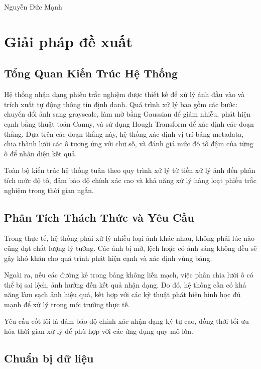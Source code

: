 \begin{savequote}[75mm] 
Nguyễn Đức Mạnh
\end{savequote}

\chapter{Giải pháp đề xuất}

\section{Tổng Quan Kiến Trúc Hệ Thống}

Hệ thống nhận dạng phiếu trắc nghiệm được thiết kế để xử lý ảnh đầu vào và trích xuất tự động thông tin định danh. Quá trình xử lý bao gồm các bước: chuyển đổi ảnh sang grayscale, làm mờ bằng Gaussian để giảm nhiễu, phát hiện cạnh bằng thuật toán Canny, và sử dụng Hough Transform để xác định các đoạn thẳng. Dựa trên các đoạn thẳng này, hệ thống xác định vị trí bảng metadata, chia thành lưới các ô tương ứng với chữ số, và đánh giá mức độ tô đậm của từng ô để nhận diện kết quả.

Toàn bộ kiến trúc hệ thống tuân theo quy trình xử lý từ tiền xử lý ảnh đến phân tích mức độ tô, đảm bảo độ chính xác cao và khả năng xử lý hàng loạt phiếu trắc nghiệm trong thời gian ngắn.

\section{Phân Tích Thách Thức và Yêu Cầu}

Trong thực tế, hệ thống phải xử lý nhiều loại ảnh khác nhau, không phải lúc nào cũng đạt chất lượng lý tưởng. Các ảnh bị mờ, lệch hoặc có ánh sáng không đều sẽ gây khó khăn cho quá trình phát hiện cạnh và xác định vùng bảng.

Ngoài ra, nếu các đường kẻ trong bảng không liền mạch, việc phân chia lưới ô có thể bị sai lệch, ảnh hưởng đến kết quả nhận dạng. Do đó, hệ thống cần có khả năng làm sạch ảnh hiệu quả, kết hợp với các kỹ thuật phát hiện hình học đủ mạnh để xử lý trong môi trường thực tế.

Yêu cầu cốt lõi là đảm bảo độ chính xác nhận dạng ký tự cao, đồng thời tối ưu hóa thời gian xử lý để phù hợp với các ứng dụng quy mô lớn.

\section{Chuẩn bị dữ liệu}







